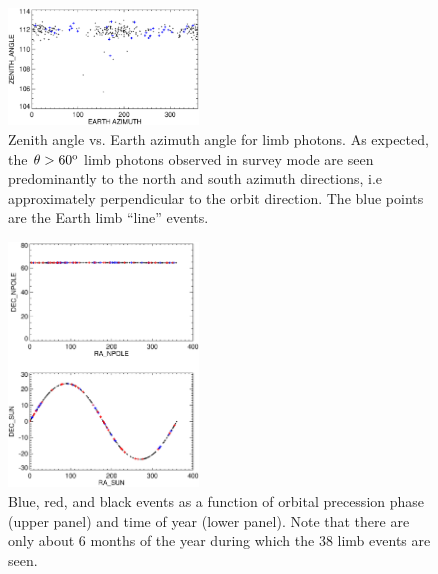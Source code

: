 \documentclass[aps,twocolumn,prd,superscriptaddress,showpacs,nofootinbib,fixfloat]{revtex4}
\newcommand{\degree}{^{\rm o}}
\begin{document}
\begin{figure}
  \centering
  \includegraphics[width=0.45\textwidth]{plots/earth-az.ps}
  \caption{Zenith angle vs. Earth azimuth angle for limb
  photons.  As expected, the $\theta > 60\degree$ limb
  photons observed in survey mode are seen predominantly to
  the north and south azimuth directions, i.e approximately
  perpendicular to the orbit direction. The blue points are
  the Earth limb ``line'' events. }
  \label{fig:earth-az}
\end{figure}

\begin{figure}
  \centering
  \includegraphics[width=0.45\textwidth]{plots/sun.ps}
  \caption{Blue, red, and black events as a function of
  orbital precession phase (upper panel) and time of year
  (lower panel).  Note that there are only about 6 months of
  the year during which the 38 limb events are seen.}
  \label{fig:sun}
\end{figure}

 
\end{document}
